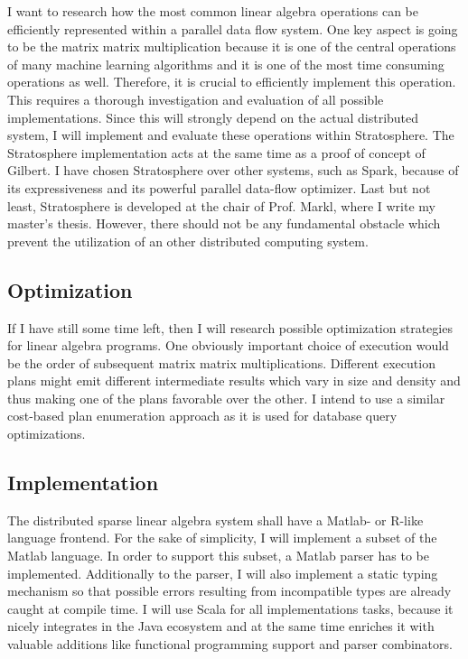 \documentclass{dima}
\begin{document}
I want to research how the most common linear algebra operations can be efficiently represented within a parallel data flow system.
One key aspect is going to be the matrix matrix multiplication because it is one of the central operations of many machine learning algorithms and it is one of the most time consuming operations as well.
Therefore, it is crucial to efficiently implement this operation.
This requires a thorough investigation and evaluation of all possible implementations.
Since this will strongly depend on the actual distributed system, I will implement and evaluate these operations within Stratosphere.
The Stratosphere implementation acts at the same time as a proof of concept of Gilbert.
I have chosen Stratosphere over other systems, such as Spark, because of its expressiveness and its powerful parallel data-flow optimizer.
Last but not least, Stratosphere is developed at the chair of Prof. Markl, where I write my master's thesis.
However, there should not be any fundamental obstacle which prevent the utilization of an other distributed computing system.

\subsection{Optimization}

If I have still some time left, then I will research possible optimization strategies for linear algebra programs.
One obviously important choice of execution would be the order of subsequent matrix matrix multiplications.
Different execution plans might emit different intermediate results which vary in size and density and thus making one of the plans favorable over the other.
I intend to use a similar cost-based plan enumeration approach as it is used for database query optimizations.

\subsection{Implementation}

The distributed sparse linear algebra system shall have a Matlab- or R-like language frontend.
For the sake of simplicity, I will implement a subset of the Matlab language.
In order to support this subset, a Matlab parser has to be implemented.
Additionally to the parser, I will also implement a static typing mechanism so that possible errors resulting from incompatible types are already caught at compile time.
I will use Scala for all implementations tasks, because it nicely integrates in the Java ecosystem and at the same time enriches it with valuable additions like functional programming support and parser combinators.
\end{document}
